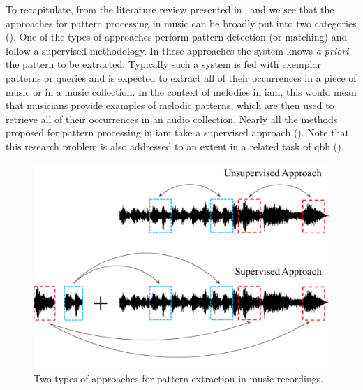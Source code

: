 
To recapitulate, from the literature review presented in~ and  we see that the approaches for pattern processing in music can be broadly put into two categories (). One of the types of approaches perform pattern detection (or matching) and follow a supervised methodology. In these approaches the system knows \textit{a priori} the pattern to be extracted. Typically such a system is fed with exemplar patterns or queries and is expected to extract all of their occurrences in a piece of music or in a music collection. In the context of melodies in \gls{iam}, this would mean that musicians provide examples of melodic patterns, which are then used to retrieve all of their occurrences in an audio collection. Nearly all the methods proposed for pattern processing in \gls{iam} take a supervised approach (). Note that this research problem is also addressed to an extent in a related task of \acrfull{qbh} ().

\begin{figure}
	\begin{center}
		\includegraphics[width=\figSizeEighty]{ch06_patterns/figures/discovery/TwoTypesOfMethodology.pdf}
	\end{center}
	\caption{Two types of approaches for pattern extraction in music recordings.}
	\label{fig:types_of_methodologies_for_extraction}
\end{figure}

